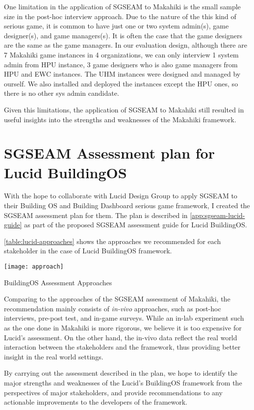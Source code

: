 One limitation in the application of SGSEAM to Makahiki is the small sample size in the post-hoc interview approach. Due to the nature of the this kind of serious game, it is common to have just one or two system admin(s), game designer(s), and game managers(s). It is often the case that the game designers are the same as the game managers. In our evaluation design, although there are 7 Makahiki game instances in 4 organizations, we can only interview 1 system admin from HPU instance, 3 game designers who is also game managers from HPU and EWC instances. The UHM instances were designed and managed by ourself. We also installed and deployed the instances except the HPU ones, so there is no other sys admin candidate.  

Given this limitations, the application of SGSEAM to Makahiki still resulted in useful insights into the strengths and weaknesses of the Makahiki framework.

\section{SGSEAM Assessment plan for Lucid BuildingOS}

With the hope to collaborate with Lucid Design Group to apply SGSEAM to their Building OS and Building Dashboard serious game framework, I created the SGSEAM assessment plan for them. The plan is described in \autoref{app:sgseam-lucid-guide} as part of the proposed SGSEAM assessment guide for Lucid BuildingOS. 

\autoref{table:lucid-approaches} shows the approaches we recommended
for each stakeholder in the case of Lucid BuildingOS framework.
 
\begin{table}[ht!]
  \center
  \texttt{[image: approach]}
  \caption{BuildingOS Assessment Approaches}
  \label{table:lucid-approaches}
\end{table}

Comparing to the approaches of the SGSEAM assessment of Makahiki, the recommendation mainly consists of {\em in-vivo} approaches, such as post-hoc interviews, pre-post test, and in-game surveys. While an in-lab experiment such as the one done in Makahiki is more rigorous, we believe it is too expensive for Lucid's assessment. On the other hand, the in-vivo data reflect the real world interaction between the stakeholders and the framework, thus providing better insight in the real world settings.

By carrying out the assessment described in the plan, we hope to identify the major strengths and weaknesses of the Lucid's BuildingOS framework from the perspectives of major stakeholders, and provide recommendations to any actionable improvements to the developers of the framework.

